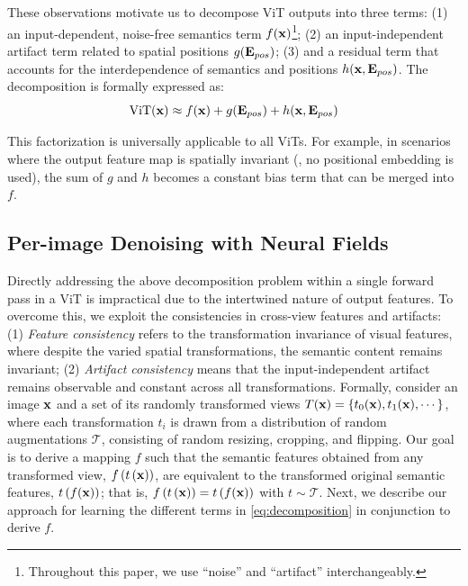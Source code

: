 These observations motivate us to decompose ViT outputs into three terms: (1) an input-dependent, noise-free semantics term $f(\vb{x})$\footnote{Throughout this paper, we use ``noise'' and ``artifact'' interchangeably.}; (2) an input-independent artifact term related to spatial positions $g(\vb{E}_{pos})$; (3) and a residual term that accounts for the interdependence of semantics and positions  $h(\vb{x}, \vb{E}_{pos})$. The decomposition is formally expressed as:
\begin{equation}
    \mathrm{ViT}(\vb{x}) \approx f(\vb{x}) + g(\vb{E}_{pos}) + h(\vb{x}, \vb{E}_{pos}) \label{eq:decomposition}
\end{equation}

This factorization is universally applicable to all ViTs. For example, in scenarios where the output feature map is spatially invariant (\eg, no positional embedding is used), the sum of $g$ and $h$ becomes a constant bias term that can be merged into $f$.


\subsection{Per-image Denoising with Neural Fields}
\label{sec:per_img_denoising}
Directly addressing the above decomposition problem within a single forward pass in a ViT is impractical due to the intertwined nature of output features. To overcome this, we exploit the consistencies in cross-view features and artifacts: (1) \textit{Feature consistency} refers to the transformation invariance of visual features, where despite the varied spatial transformations, the semantic content remains invariant; (2) \textit{Artifact consistency} means that the input-independent artifact remains observable and constant across all transformations. Formally, consider an image $\vb{x}$ and a set of its randomly transformed views $T(\vb{x})=\{t_0(\vb{x}), t_1(\vb{x}), \cdots\}$, where each transformation $t_{i}$ is drawn from a distribution of random augmentations $\mathcal{T}$, consisting of random resizing, cropping, and flipping. Our goal is to derive a mapping $f$ such that the semantic features obtained from any transformed view, $f\left(t\left(\vb{x}\right)\right)$, are equivalent to the transformed original semantic features, $t\left(f(\vb{x})\right)$; that is, $f\left(t\left(\vb{x}\right)\right)=t\left(f(\vb{x})\right)$ with $t \sim \mathcal{T}$. Next, we describe our approach for learning the different terms in \cref{eq:decomposition} in conjunction to derive $f$.

